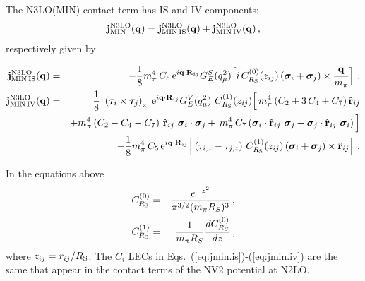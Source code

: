 \documentclass[aps,prc,floatfix,showpacs,twocolumn, preprintnumbers]{revtex4-2}
\begin{document}
The N3LO(MIN) contact term has IS and IV components: 
\begin{equation}
    {\bf j}^{\rm N3LO}_{\rm MIN}({\bf q})={\bf j}^{\rm N3LO}_{\rm MIN\, IS}({\bf q})+{\bf j}^{\rm N3LO}_{\rm MIN\, IV}({\bf q})\, \label{eq:jmin},
\end{equation}
respectively given by
\begin{widetext}
\begin{eqnarray}
%
{\bf j}^{\rm N3LO}_{\rm MIN\,IS}({\bf q})&=&
-\frac{1}{8} m_\pi^4\, C_5 \,{\rm e}^{i{\bf q}\cdot{\bf R}_{ij}}G^S_E(q_{\mu}^2) \Big[  i\, C^{(0)}_{R_{\rm S}}(z_{ij})\left({\bm \sigma}_i+{\bm \sigma}_j\right) \times \frac{\bf q}{m_\pi}\Big] \ ,\label{eq:jmin.is} \\
%
{\bf j}^{\rm N3LO}_{\rm MIN\, IV}({\bf q})&=&\frac{1 }{8}\,  \,
\left({\bm \tau}_i\times{\bm \tau}_j\right)_z\,\,
{\rm e}^{i{\bf q}\cdot{\bf R}_{ij}} G^V_E(q_{\mu}^2)\
C^{(1)}_{R_{\rm S}}(z_{ij}) 
\Big[ \, m_\pi^4\left( C_2+3\, C_4+C_7\right) \hat {\bf r}_{ij} \nonumber \\
&& + m_\pi^4\left( C_2-C_4-C_7\right)  \,\hat {\bf r}_{ij} \, \,{\bm \sigma}_i\cdot{\bm \sigma}_j + \, m_\pi^4\, C_7 \left( {\bm \sigma}_i\cdot \hat{\bf r}_{ij}\,\, {\bm \sigma}_j
+ {\bm \sigma}_j\cdot \hat{\bf r}_{ij}\,\, {\bm \sigma}_i\right) \Big] \nonumber \\
&& -\frac{1}{8} m_\pi^4\, C_5 \,{\rm e}^{i{\bf q}\cdot{\bf R}_{ij}} \Big[ \left(\tau_{i,z}-\tau_{j,z}\right)\, 
C^{(1)}_{R_{\rm S}}(z_{ij}) 
 \left({\bm \sigma}_i+{\bm \sigma}_j\right)
\times \hat{\bf r}_{ij}  \Big] \ .\label{eq:jmin.iv} 
\end{eqnarray}
\end{widetext}
In the equations above
\begin{eqnarray}
C^{(0)}_{R_{\rm S}} &=& \frac{e^{-z^2}}{\pi^{3/2}(m_{\pi}R_S)^3} \, ,\\
C^{(1)}_{R_{\rm S}} &=& \frac{1}{m_{\pi}R_S} \frac{dC^{(0)}_{R_S}}{dz}\, , 
\end{eqnarray}
where $z_{ij}=r_{ij}/R_{\rm S}$.
The $C_i$ LECs  in Eqs.~(\ref{eq:jmin.is})-(\ref{eq:jmin.iv}) are the same that appear in the contact terms of the NV2 potential at N2LO.
\end{document}
